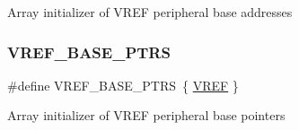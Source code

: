 Array initializer of V\+R\+EF peripheral base addresses \mbox{\label{group___v_r_e_f___peripheral___access___layer_ga3eb17aee5de4a519ee18fe763e43865b}} 
\subsubsection{\texorpdfstring{VREF\_BASE\_PTRS}{VREF\_BASE\_PTRS}}
{\footnotesize\ttfamily \#define V\+R\+E\+F\+\_\+\+B\+A\+S\+E\+\_\+\+P\+T\+RS~\{ \mbox{\hyperlink{group___v_r_e_f___peripheral___access___layer_ga2c9e85d22a9ba37ea589b1747af46307}{V\+R\+EF}} \}}

Array initializer of V\+R\+EF peripheral base pointers 